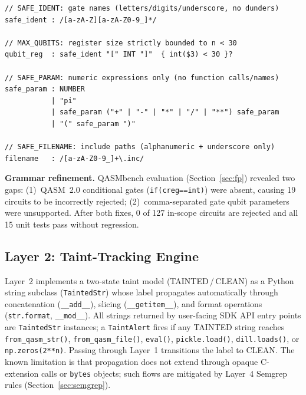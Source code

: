 \documentclass[conference,compsoc]{IEEEtran}
\begin{document}
\begin{lstlisting}[language={},
  caption={Key rules from the QuantumShield Lark grammar (excerpt).}]
// SAFE_IDENT: gate names (letters/digits/underscore, no dunders)
safe_ident : /[a-zA-Z][a-zA-Z0-9_]*/

// MAX_QUBITS: register size strictly bounded to n < 30
qubit_reg  : safe_ident "[" INT "]"  { int($3) < 30 }?

// SAFE_PARAM: numeric expressions only (no function calls/names)
safe_param : NUMBER
           | "pi"
           | safe_param ("+" | "-" | "*" | "/" | "**") safe_param
           | "(" safe_param ")"

// SAFE_FILENAME: include paths (alphanumeric + underscore only)
filename   : /[a-zA-Z0-9_]+\.inc/
\end{lstlisting}

\noindent
\textbf{Grammar refinement.}
QASMbench evaluation (Section~\ref{sec:fp}) revealed two gaps:
(1)~QASM~2.0 conditional gates (\texttt{if(creg==int)}) were absent,
causing 19 circuits to be incorrectly rejected;
(2)~comma-separated gate qubit parameters were unsupported.
After both fixes, 0 of 127 in-scope circuits are rejected and all
15 unit tests pass without regression.

\subsection{Layer 2: Taint-Tracking Engine}
\noindent Layer~2 implements a two-state taint model (TAINTED\,/\,CLEAN)
as a Python string subclass (\texttt{TaintedStr}) whose label
propagates automatically through concatenation (\texttt{\_\_add\_\_}),
slicing (\texttt{\_\_getitem\_\_}), and format operations
(\texttt{str.format}, \texttt{\_\_mod\_\_}).
All strings returned by user-facing SDK API entry points are
\texttt{TaintedStr} instances; a \texttt{TaintAlert} fires if any
TAINTED string reaches
\texttt{from\_qasm\_str()}, \texttt{from\_qasm\_file()},
\texttt{eval()}, \texttt{pickle.load()}, \texttt{dill.loads()},
or \texttt{np.zeros(2**n)}.
Passing through Layer~1 transitions the label to CLEAN.
The known limitation is that propagation does not extend through
opaque C-extension calls or \texttt{bytes} objects; such flows
are mitigated by Layer~4 Semgrep rules (Section~\ref{sec:semgrep}).
\end{document}
